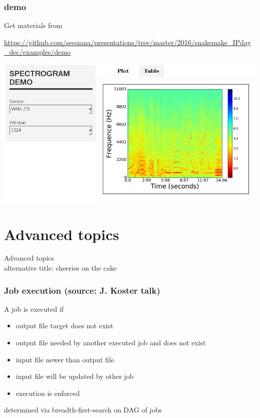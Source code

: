 \documentclass{beamer}
\begin{document}

\begin{frame}[fragile]
\frametitle{demo}
Get materials from  

\url{https://github.com/sequana/presentations/tree/master/2016/snakemake_IPday_dec/examples/demo}
\begin{block}{}
 \includegraphics[scale=0.32]{images/results.png}
\end{block}
\end{frame}




\section{Advanced topics}
\begin{frame}[plain]
 \centering
 \begin{Huge}
Advanced topics 
\\
\large{alternative title: cheeries on the cake}
\end{Huge}
\end{frame}


\begin{frame}
\frametitle{Job execution \tiny{(source: J. Koster talk)}}
 A job is executed if
 \begin{itemize}
 \item  output file target does not exist
 \item  output file needed by another executed job and does not exist
 \item  input file newer than output file
 \item  input file will be updated by other job
 \item  execution is enforced
\end{itemize}
determined via breadth-first-search on DAG of jobs 
\end{frame}
\end{document}
